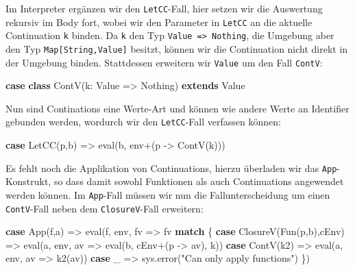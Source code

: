 \documentclass[]{article}
\newenvironment{Shaded}{}{}
\newcommand{\FunctionTok}[1]{\textcolor[rgb]{0.02,0.16,0.49}{#1}}
\newcommand{\KeywordTok}[1]{\textcolor[rgb]{0.00,0.44,0.13}{\textbf{#1}}}
\newcommand{\NormalTok}[1]{#1}
\newcommand{\StringTok}[1]{\textcolor[rgb]{0.25,0.44,0.63}{#1}}
\begin{document}
Im Interpreter ergänzen wir den \texttt{LetCC}-Fall, hier setzen wir die
Auswertung rekursiv im Body fort, wobei wir den Parameter in
\texttt{LetCC} an die aktuelle Continuation \texttt{k} binden. Da
\texttt{k} den Typ \texttt{Value\ =\textgreater{}\ Nothing}, die
Umgebung aber den Typ \texttt{Map{[}String,Value{]}} besitzt, können wir
die Continuation nicht direkt in der Umgebung binden. Stattdessen
erweitern wir \texttt{Value} um den Fall \texttt{ContV}:

\begin{Shaded}
\begin{Highlighting}[]
\KeywordTok{case} \KeywordTok{class} \FunctionTok{ContV}\NormalTok{(k: Value =\textgreater{} Nothing) }\KeywordTok{extends}\NormalTok{ Value}
\end{Highlighting}
\end{Shaded}

Nun sind Continations eine Werte-Art und können wie andere Werte an
Identifier gebunden werden, wordurch wir den \texttt{LetCC}-Fall
verfassen können:

\begin{Shaded}
\begin{Highlighting}[]
\KeywordTok{case} \FunctionTok{LetCC}\NormalTok{(p,b) =\textgreater{} }\FunctionTok{eval}\NormalTok{(b, env+(p {-}\textgreater{} }\FunctionTok{ContV}\NormalTok{(k)))}
\end{Highlighting}
\end{Shaded}

Es fehlt noch die Applikation von Continuations, hierzu überladen wir
das \texttt{App}-Konstrukt, so dass damit sowohl Funktionen als auch
Continuations angewendet werden können. Im \texttt{App}-Fall müssen wir
nun die Fallunterscheidung um einen \texttt{ContV}-Fall neben dem
\texttt{ClosureV}-Fall erweitern:

\begin{Shaded}
\begin{Highlighting}[]
\KeywordTok{case} \FunctionTok{App}\NormalTok{(f,a) =\textgreater{} }\FunctionTok{eval}\NormalTok{(f, env, fv =\textgreater{} fv }\KeywordTok{match}\NormalTok{ \{}
  \KeywordTok{case} \FunctionTok{ClosureV}\NormalTok{(}\FunctionTok{Fun}\NormalTok{(p,b),cEnv) =\textgreater{}}
    \FunctionTok{eval}\NormalTok{(a, env, av =\textgreater{} }\FunctionTok{eval}\NormalTok{(b, cEnv+(p {-}\textgreater{} av), k))}
  \KeywordTok{case} \FunctionTok{ContV}\NormalTok{(k2) =\textgreater{} }\FunctionTok{eval}\NormalTok{(a, env, av =\textgreater{} }\FunctionTok{k2}\NormalTok{(av))}
  \KeywordTok{case}\NormalTok{ \_ =\textgreater{} sys.}\FunctionTok{error}\NormalTok{(}\StringTok{"Can only apply functions"}\NormalTok{)}
\NormalTok{\})}
\end{Highlighting}
\end{Shaded}
\end{document}
